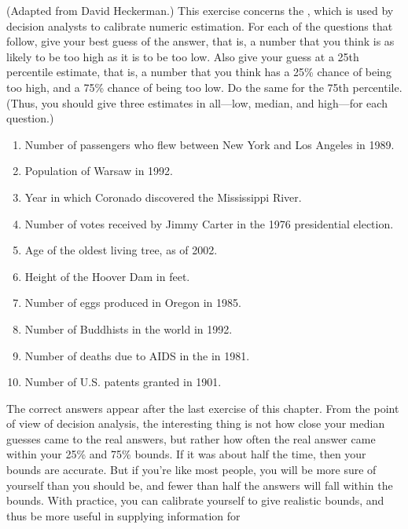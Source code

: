 
\begin{exercise}%
(Adapted from David Heckerman.)  This exercise
concerns the , which is used
by decision analysts to calibrate numeric estimation.  For each of
the questions that follow, give your best guess of the answer, that
is, a number that you think is as likely to be too high as it is to be
too low.  Also give your guess at a 25th percentile estimate, that is,
a number that you think has a 25\% chance of being too high, and a
75\% chance of being too low.  Do the same for the 75th
percentile. (Thus, you should give three estimates in all---low,
median, and high---for each question.)
\begin{enumerate}
\item Number of passengers who flew between New York and Los Angeles in 1989.
\item Population of Warsaw in 1992.
\item Year in which Coronado discovered the Mississippi River.
\item Number of votes received by Jimmy Carter in the 1976 presidential
election. 
\item Age of the oldest living tree, as of 2002.
\item Height of the Hoover Dam in feet.
\item Number of eggs produced in Oregon in 1985.
\item Number of Buddhists in the world in 1992.
\item Number of deaths due to AIDS in the  in 1981.
\item Number of U.S. patents granted in 1901.
\end{enumerate}
The correct answers appear after the last exercise of this chapter.  From the
point of view of decision analysis, the interesting thing is not how close
your median guesses came to the real answers, but rather how often the real
answer came within your 25\% and 75\% bounds.  If it was about half the time,
then your bounds are accurate.  But if you're like most people, you will be
more sure of yourself than you should be, and fewer than half the answers will
fall within the bounds.  With practice, you can calibrate yourself to give
realistic bounds, and thus be more useful in supplying information for

\end{exercise}
